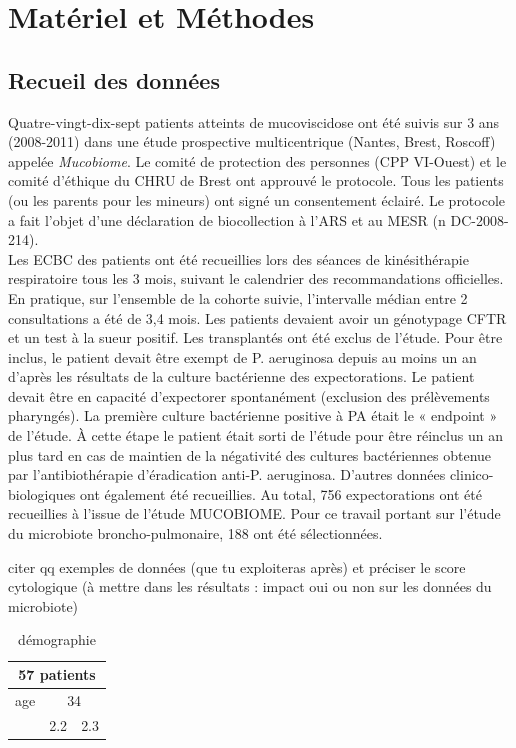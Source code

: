 \documentclass[12pt,a4paper]{article}
\begin{document}
\section{Matériel et Méthodes}
\subsection{Recueil des données}

Quatre-vingt-dix-sept patients atteints de mucoviscidose ont été suivis sur 3 ans (2008-2011) dans une étude prospective multicentrique (Nantes, Brest, Roscoff) appelée \textit{Mucobiome}.
Le comité de protection des personnes (CPP VI-Ouest) et le comité d’éthique du CHRU de Brest ont approuvé le protocole. Tous les patients (ou les parents pour les mineurs) ont signé un consentement éclairé. Le protocole a fait l’objet d’une déclaration de biocollection à l’ARS et au MESR (n DC-2008-214).\\
Les ECBC des patients ont été recueillies lors des séances de kinésithérapie respiratoire tous les 3 mois, suivant le calendrier des recommandations officielles. En pratique, sur l’ensemble de la cohorte suivie, l’intervalle médian entre 2 consultations a été de 3,4 mois.
Les patients devaient avoir un génotypage CFTR et un test à la sueur positif. Les transplantés ont été exclus de l’étude.
Pour être inclus, le patient devait être exempt de P. aeruginosa depuis au moins un an d’après les résultats de la culture bactérienne des expectorations. Le patient devait être en capacité d’expectorer spontanément (exclusion des prélèvements pharyngés).
La première culture bactérienne positive à PA était le « endpoint » de l’étude. À cette étape le patient était sorti de l’étude pour être réinclus un an plus tard en cas de maintien de la négativité des cultures bactériennes obtenue par l’antibiothérapie d’éradication anti-P. aeruginosa. D’autres données clinico-biologiques ont également été recueillies. Au total, 756 expectorations ont été recueillies à l’issue de l’étude MUCOBIOME. Pour ce travail portant sur l’étude du microbiote broncho-pulmonaire, 188 ont été sélectionnées.

citer qq exemples de données (que tu exploiteras après) et préciser le score
cytologique (à mettre dans les résultats : impact oui ou non sur les données du microbiote)

\begin{table}[h]
\centering
   \caption{démographie}
   \begin{tabular}{|l|c|c}
        \hline
   \multicolumn{3}{|c|}{     57 patients     } \\
    \hline
    age & \multicolumn{2}{|c|}{34}  \\
    \hline

        & 2.2 & 2.3 \\
    \hline
   \end{tabular}
\end{table}
\end{document}
